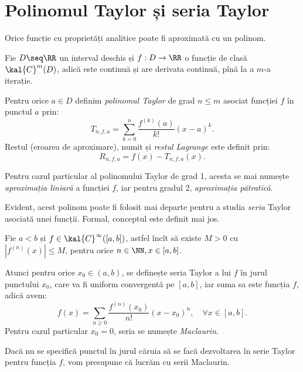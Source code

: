 
\section{Polinomul Taylor și seria Taylor}

Orice funcție cu proprietăți analitice  poate fi aproximată cu un polinom.

\begin{definition}\label{def:pol-taylor}
  Fie $ D \seq \RR $ un interval deschis și $ f : D \to \RR $ o funcție de clasă
  $ \kal{C}^m(D) $, adică este continuă și are derivata continuă, pînă la a $ m $-a
  iterație.

  Pentru orice $ a \in D $ definim \emph{polinomul Taylor} de grad $ n \leq m $
  asociat funcției $ f $ în punctul $ a $ prin:
  \[
    T_{n, f, a} = \sum_{k = 0}^n \dfrac{f^{(k)}(a)}{k!} (x - a)^k.
  \]
  Restul (eroarea de aproximare), numit și \emph{restul Lagrange} este definit
  prin:
  \[
    R_{n, f, a} = f(x) - T_{n, f, a}(x).
  \]
\end{definition}

Pentru cazul particular al polinomului Taylor de grad 1, acesta se mai numește
\emph{aproximația liniară} a funcției $ f $, iar pentru gradul 2,
\emph{aproximația pătratică}.

Evident, acest polinom poate fi folosit mai departe pentru a studia \emph{seria} Taylor
asociată unei funcții. Formal, conceptul este definit mai jos.

\begin{theorem}\label{thm:seria-taylor}
  Fie $ a < b $ și $ f \in \kal{C}^\infty([a, b]) $, astfel încît să existe
  $ M > 0 $ cu $ |f^{(n)}(x)| \leq M $, pentru orice $ n \in \NN, x \in [a, b] $.

  Atunci pentru orice $ x_0 \in (a, b) $, se definește seria Taylor a lui $ f $ în
  jurul punctului $ x_0 $, care va fi uniform convergentă pe $ [a, b] $, iar
  suma sa este funcția $ f $, adică avem:
  \[
    f(x) = \sum_{n \geq 0} \dfrac{f^{(n)}(x_0)}{n!} (x - x_0)^n, \quad \forall x \in [a, b].
  \]
  Pentru cazul particular $ x_0 = 0 $, seria se numește \emph{Maclaurin.}
\end{theorem}

\begin{remark}\label{rk:mac}
  Dacă nu se specifică punctul în jurul căruia să se facă dezvoltarea în serie Taylor
  pentru funcția $ f $, vom presupune că lucrăm cu serii Maclaurin.
\end{remark}

